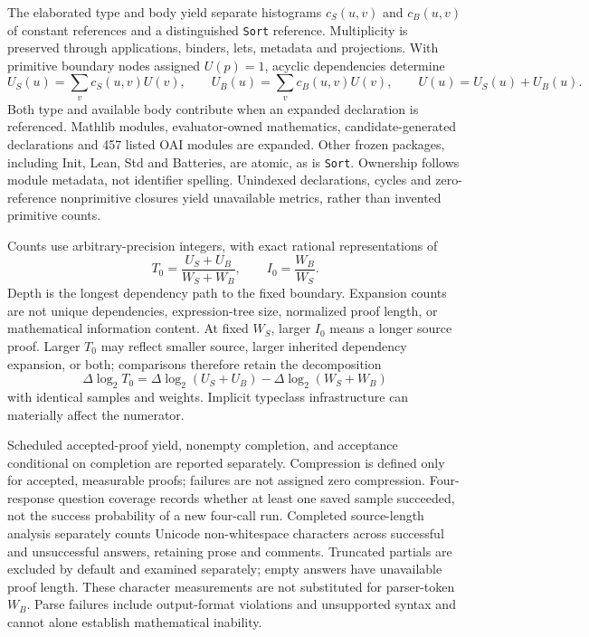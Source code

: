 \documentclass[11pt]{article}
\begin{document}
The elaborated type and body yield separate histograms $c_S(u,v)$ and $c_B(u,v)$ of constant references and a distinguished \texttt{Sort} reference. Multiplicity is preserved through applications, binders, lets, metadata and projections. With primitive boundary nodes assigned $U(p)=1$, acyclic dependencies determine
\begin{equation}
 U_S(u)=\sum_v c_S(u,v)U(v),\qquad
 U_B(u)=\sum_v c_B(u,v)U(v),\qquad
 U(u)=U_S(u)+U_B(u).
\label{eq:methods-expansion}
\end{equation}
Both type and available body contribute when an expanded declaration is referenced. Mathlib modules, evaluator-owned mathematics, candidate-generated declarations and 457 listed OAI modules are expanded. Other frozen packages, including Init, Lean, Std and Batteries, are atomic, as is \texttt{Sort}. Ownership follows module metadata, not identifier spelling. Unindexed declarations, cycles and zero-reference nonprimitive closures yield unavailable metrics, rather than invented primitive counts.

Counts use arbitrary-precision integers, with exact rational representations of
\begin{equation}
 T_0=\frac{U_S+U_B}{W_S+W_B},\qquad I_0=\frac{W_B}{W_S}.
\label{eq:methods-ratios}
\end{equation}
Depth is the longest dependency path to the fixed boundary. Expansion counts are not unique dependencies, expression-tree size, normalized proof length, or mathematical information content. At fixed $W_S$, larger $I_0$ means a longer source proof. Larger $T_0$ may reflect smaller source, larger inherited dependency expansion, or both; comparisons therefore retain the decomposition
\begin{equation}
 \Delta\log_2 T_0=\Delta\log_2(U_S+U_B)-\Delta\log_2(W_S+W_B)
\label{eq:methods-decomposition}
\end{equation}
with identical samples and weights. Implicit typeclass infrastructure can materially affect the numerator.

Scheduled accepted-proof yield, nonempty completion, and acceptance conditional on completion are reported separately. Compression is defined only for accepted, measurable proofs; failures are not assigned zero compression. Four-response question coverage records whether at least one saved sample succeeded, not the success probability of a new four-call run. Completed source-length analysis separately counts Unicode non-whitespace characters across successful and unsuccessful answers, retaining prose and comments. Truncated partials are excluded by default and examined separately; empty answers have unavailable proof length. These character measurements are not substituted for parser-token $W_B$. Parse failures include output-format violations and unsupported syntax and cannot alone establish mathematical inability.
\end{document}
